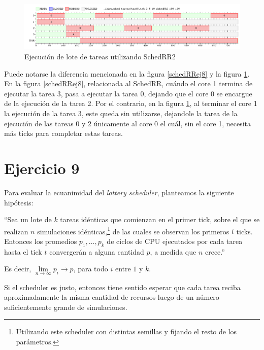 \documentclass[a4paper,10pt,twoside]{article}
\begin{document}
\begin{figure}[ht!]
\centering
\includegraphics[width=175mm]{../ejercicio8/schedRR2ej8.png}
\caption{Ejecución de lote de tareas utilizando SchedRR2}
\label{schedRR2ej8}
\end{figure}

Puede notarse la diferencia mencionada en la figura \ref{schedRRej8} y la figura \ref{schedRR2ej8}. En la figura \ref{schedRRej8}, relacionada al SchedRR, cuándo el core 1 termina de ejecutar la tarea 3, pasa a ejecutar la tarea 0, dejando que el core 0 se encargue de la ejecución de la tarea 2. Por el contrario, en la figura \ref{schedRR2ej8}, al terminar el core 1 la ejecución de la tarea 3, este queda sin utilizarse, dejandole la tarea de la ejecución de las tareas 0 y 2 únicamente al core 0 el cuál, sin el core 1, necesita más ticks para completar estas tareas.



\section{Ejercicio 9}

Para evaluar la ecuanimidad del \textit{lottery scheduler}, planteamos la siguiente hipótesis:

``Sea un lote de $k$ tareas idénticas que comienzan en el primer tick, sobre el que se realizan $n$ simulaciones idénticas,\footnote{Utilizando este scheduler con distintas semillas y fijando el resto de los parámetros.} de las cuales se observan los primeros $t$ ticks. Entonces los promedios $p_1, \ldots, p_k$ de ciclos de CPU ejecutados por cada tarea hasta el tick $t$ convergerán a alguna cantidad $p$, a medida que $n$ crece.''

Es decir, $\lim \limits_{n \to \infty} p_i \to p$, para todo $i$ entre $1$ y $k$.

Si el scheduler es justo, entonces tiene sentido esperar que cada tarea reciba aproximadamente la misma cantidad de recursos luego de un número suficientemente grande de simulaciones. 
\end{document}
